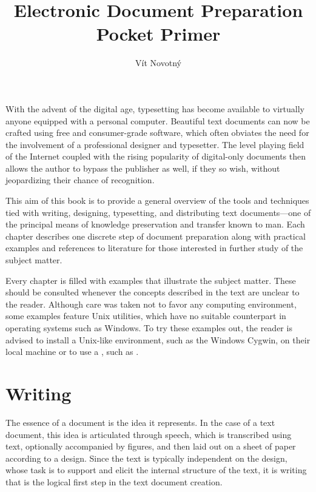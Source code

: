 \documentclass[
  a5paper,10pt,           %
  dvipsnames              %
]{book}
\begin{document}
\frontmatter
\title{Electronic Document Preparation\\Pocket Primer}
\author{Vít Novotný}
\maketitle
\tableofcontents
\mainmatter
{}
With the advent of the digital age, typesetting has become available to
virtually anyone equipped with a personal computer. Beautiful text documents can
now be crafted using free and consumer-grade software, which often obviates the
need for the involvement of a professional designer and typesetter. The level
playing field of the Internet coupled with the rising popularity of digital-only
documents then allows the author to bypass the publisher as well, if they so
wish, without jeopardizing their chance of recognition.

This aim of this book is to provide a general overview of the tools and
techniques tied with writing, designing, typesetting, and distributing text
documents---one of the principal means of knowledge preservation and transfer
known to man. Each chapter describes one discrete step of document preparation
along with practical examples and references to literature for those interested
in further study of the subject matter.

Every chapter is filled with examples that illustrate the subject matter. These
should be consulted whenever the concepts described in the text are unclear to
the reader. Although care was taken not to favor any computing environment,
some examples feature Unix utilities, which have no suitable counterpart in
operating systems such as Windows. To try these examples out, the reader is
advised to install a Unix-like environment, such as the Windows Cygwin, on their
local machine or to use a \Unix, such as \Linux.

\chapter{Writing}
The essence of a document is the idea it represents. In the case of a text
document, this idea is articulated through speech, which is transcribed using
text, optionally accompanied by figures, and then laid out on a sheet of paper
according to a design. Since the text is typically independent on the design,
whose task is to support and elicit the internal structure of the text, it is
writing that is the logical first step in the text document creation.
\end{document}
